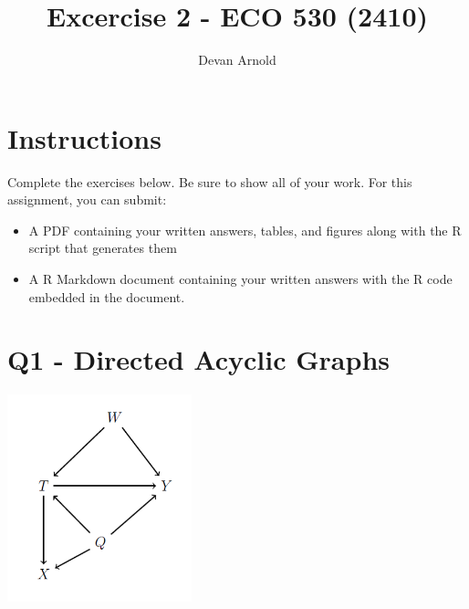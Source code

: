 \documentclass[
]{article}
\title{Excercise 2 - ECO 530 (2410)}
\author{Devan Arnold}
\date{}
\providecommand{\tightlist}{%
  \setlength{\itemsep}{0pt}\setlength{\parskip}{0pt}}
\begin{document}
\maketitle

\DeclareMathOperator{\Lagr}{\mathcal{L}}
\DeclareMathOperator{\sumn}{\sum_{i=1}^n}
\DeclareMathOperator{\bh}{\hat{\beta}}
\DeclareMathOperator{\yh}{\hat{y}}
\DeclareMathOperator{\ybar}{\bar{y}}
\DeclareMathOperator{\xbar}{\bar{x}}

\hfill\break

\hfill\break

\hypertarget{instructions}{%
\section{Instructions}\label{instructions}}

Complete the exercises below. Be sure to show all of your work. For this
assignment, you can submit:

\begin{itemize}
\tightlist
\item
  A PDF containing your written answers, tables, and figures along with
  the R script that generates them
\item
  A R Markdown document containing your written answers with the R code
  embedded in the document.
\end{itemize}

\hfill\break

\hfill\break

\hypertarget{q1---directed-acyclic-graphs}{%
\section{Q1 - Directed Acyclic
Graphs}\label{q1---directed-acyclic-graphs}}

\includegraphics[width=0.4\textwidth,height=\textheight]{dag1.png}

\hfill\break
\end{document}
